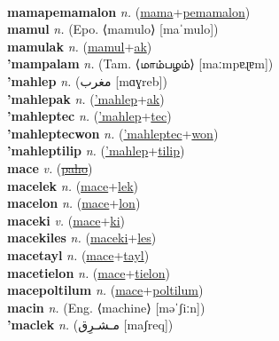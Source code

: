  \label{mamatapalon} \\
\textbf{mamapemamalon} \textit{n.} (\hyperref[mama]{mama}+\hyperref[pemamalon]{pemamalon})
 \label{mamapemamalon} \\
\textbf{mamul} \textit{n.} (Epo. ⟨mamulo⟩ [maˈmulo])
 \label{mamul} \\
\textbf{mamulak} \textit{n.} (\hyperref[mamul]{mamul}+\hyperref[ak]{ak})
 \label{mamulak} \\
\textbf{'mampalam} \textit{n.} (Tam. ⟨மாம்பழம்⟩ [maːmpɐɻɐm])
 \label{'mampalam} \\
\textbf{'mahlep} \textit{n.} ({\arabics{}مغرب‎} [mɑɣreb])
 \label{'mahlep} \\
\textbf{'mahlepak} \textit{n.} (\hyperref['mahlep]{'mahlep}+\hyperref[ak]{ak})
 \label{'mahlepak} \\
\textbf{'mahleptec} \textit{n.} (\hyperref['mahlep]{'mahlep}+\hyperref[tec]{tec})
 \label{'mahleptec} \\
\textbf{'mahleptecwon} \textit{n.} (\hyperref['mahleptec]{'mahleptec}+\hyperref[won]{won})
 \label{'mahleptecwon} \\
\textbf{'mahleptilip} \textit{n.} (\hyperref['mahlep]{'mahlep}+\hyperref[tilip]{tilip})
 \label{'mahleptilip} \\
\textbf{mace} \textit{v.} (\hyperref[paho]{\sout{paho}})
 \label{mace} \\
\textbf{macelek} \textit{n.} (\hyperref[mace]{mace}+\hyperref[lek]{lek})
 \label{macelek} \\
\textbf{macelon} \textit{n.} (\hyperref[mace]{mace}+\hyperref[lon]{lon})
 \label{macelon} \\
\textbf{maceki} \textit{v.} (\hyperref[mace]{mace}+\hyperref[ki]{ki})
 \label{maceki} \\
\textbf{macekiles} \textit{n.} (\hyperref[maceki]{maceki}+\hyperref[les]{les})
 \label{macekiles} \\
\textbf{macetayl} \textit{n.} (\hyperref[mace]{mace}+\hyperref[tayl]{tayl})
 \label{macetayl} \\
\textbf{macetielon} \textit{n.} (\hyperref[mace]{mace}+\hyperref[tielon]{tielon})
 \label{macetielon} \\
\textbf{macepoltilum} \textit{n.} (\hyperref[mace]{mace}+\hyperref[poltilum]{poltilum})
 \label{macepoltilum} \\
\textbf{macin} \textit{n.} (Eng. ⟨machine⟩ [məˈʃiːn])
 \label{macin} \\
\textbf{'maclek} \textit{n.} ({\arabics{}مـشـرِق‎‎} [maʃreq])
 \label{'maclek} \\
